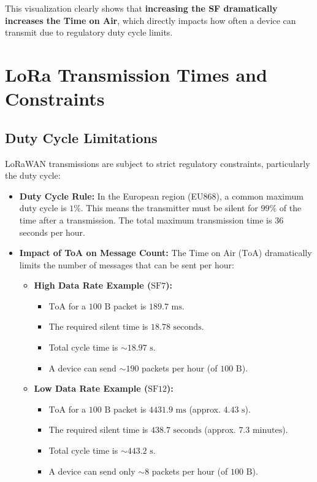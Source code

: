 \documentclass[a4paper, 12pt]{book} %
\begin{document}
This visualization clearly shows that \textbf{increasing the SF
dramatically increases the Time on Air}, which directly impacts how
often a device can transmit due to regulatory duty cycle limits.

\chapter{LoRa Transmission Times and
Constraints}\label{lora-transmission-times-and-constraints}

\section{Duty Cycle Limitations}\label{duty-cycle-limitations}

LoRaWAN transmissions are subject to strict regulatory constraints,
particularly the duty cycle:

\begin{itemize}
\tightlist
\item
  \textbf{Duty Cycle Rule:} In the European region (EU868), a common
  maximum duty cycle is \textbf{\(1\%\)}. This means the transmitter
  must be silent for \(99\%\) of the time after a transmission. The
  total maximum transmission time is \(36\) seconds per hour.
\item
  \textbf{Impact of ToA on Message Count:} The Time on Air
  (\(\text{ToA}\)) dramatically limits the number of messages that can
  be sent per hour:

  \begin{itemize}
  \tightlist
  \item
    \textbf{High Data Rate Example (\(\text{SF}7\)):}

    \begin{itemize}
    \tightlist
    \item
      \(\text{ToA}\) for a \(100 \text{ B}\) packet is
      \(189.7 \text{ ms}\).
    \item
      The required silent time is \(18.78 \text{ seconds}\).
    \item
      Total cycle time is \(\sim 18.97 \text{ s}\).
    \item
      A device can send \(\sim 190\) packets per hour (of
      \(100 \text{ B}\)).
    \end{itemize}
  \item
    \textbf{Low Data Rate Example (\(\text{SF}12\)):}

    \begin{itemize}
    \tightlist
    \item
      \(\text{ToA}\) for a \(100 \text{ B}\) packet is
      \(4431.9 \text{ ms}\) (approx. \(4.43 \text{ s}\)).
    \item
      The required silent time is \(438.7 \text{ seconds}\) (approx.
      \(7.3 \text{ minutes}\)).
    \item
      Total cycle time is \(\sim 443.2 \text{ s}\).
    \item
      A device can send only \(\sim 8\) packets per hour (of
      \(100 \text{ B}\)).
    \end{itemize}
  \end{itemize}
\end{itemize}
\end{document}

